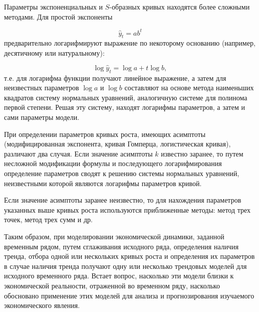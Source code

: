 Параметры экспоненциальных и $S$-образных кривых находятся более сложными методами. Для простой экспоненты

\[ \hat{y}_t = ab^t \]
предварительно логарифмируют выражение по некоторому основанию (например, десятичному или натуральному):

\[ \log \hat{y}_t = \log a + t \log b, \]
т.е. для логарифма функции получают линейное выражение, а затем для неизвестных параметров $\log a$ и $\log b$ составляют на основе метода наименьших квадратов систему нормальных уравнений, аналогичную системе для полинома первой степени. Решая эту систему, находят логарифмы параметров, а затем и сами параметры модели.

При определении параметров кривых роста, имеющих асимптоты (модифицированная экспонента, кривая Гомперца, логистическая кривая), различают два случая. Если значение асимптоты $ k $ известно заранее, то путем несложной модификации формулы и последующего логарифмирования определение параметров сводят к решению системы нормальных уравнений, неизвестными которой являются логарифмы параметров кривой.

Если значение асимптоты заранее неизвестно, то для нахождения параметров указанных выше кривых роста используются приближенные методы: метод трех точек, метод трех сумм и др.

Таким образом, при моделировании экономической динамики, заданной временным рядом, путем сглаживания исходного ряда, определения наличия тренда, отбора одной или нескольких кривых роста и определения их параметров в случае наличия тренда получают одну или несколько трендовых моделей для исходного временного ряда. Встает вопрос, насколько эти модели близки к экономической реальности, отраженной во временном ряду, насколько обосновано применение этих моделей для анализа и прогнозирования изучаемого экономического явления.


























